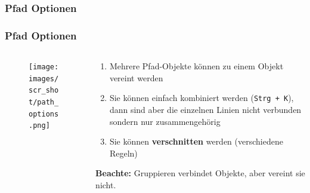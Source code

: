 \documentclass[german]{beamer} %
\newcommand{\images}{vektorzeichnen/}
\begin{document}

\subsubsection{Pfad Optionen}
\begin{frame}[t]
  \frametitle{Pfad Optionen}
  
  \begin{columns}[t]
  	\begin{column}{0.3\textwidth}
  		\begin{figure}
  		   \centering
  			\texttt{[image: \\images/scr\_shot/path\_options.png]}
  			\label{fig:inkscape_scr_shot_path_options}
  		\end{figure}
  	\end{column}
  	
  	\begin{column}{0.7\textwidth}
  		\begin{enumerate}
  			\item Mehrere Pfad-Objekte können zu einem Objekt vereint werden
  			\item Sie können einfach kombiniert werden (\texttt{Strg + K}), dann sind aber die einzelnen Linien nicht verbunden sondern nur \grqq zusammengehörig\grqq
  			\item Sie können \textbf{verschnitten} werden (verschiedene \grqq Regeln\grqq)
  		\end{enumerate}
  		
  		\vspace{1em}
  		\alert{\textbf{Beachte:} Gruppieren verbindet Objekte, aber vereint sie nicht.}
  		
  	\end{column}
  \end{columns}
  
 \end{frame}
 
\end{document}
